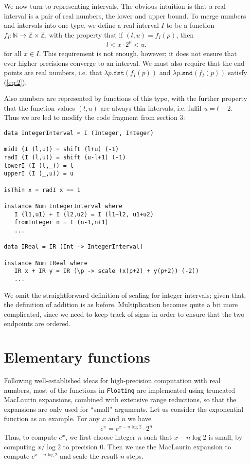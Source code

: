 \documentclass[9pt, a4, twocolumn]{article}
\begin{document}
We now turn to representing intervals. The obvious intuition is that a
real interval is a pair of real numbers, the lower and upper bound. 
To merge numbers and intervals into one type, we define a real interval $I$ to be a function 
$f_I : \mathbb{N} \rightarrow \mathbb{Z} \times \mathbb{Z}$, with the
property that if $(l,u) = f_I(p)$, then 
\begin{align*}
l < x \cdot 2^p < u.  
\end{align*}
for all $x \in I$. This requirement is not enough, however; it does
not ensure that ever higher precisions converge to an interval. We must
also require that the end points are real numbers, i.e. that
$\lambda p.\texttt{fst}(f_I(p))$ and $\lambda p.\texttt{snd}(f_I(p))$ 
satisfy (\ref{eq:2}).

Also numbers are represented by functions of this type, with the
further property that the function values $(l,u)$ are always thin
intervals, i.e. fulfil $u=l+2$. Thus we are led to modify the code
fragment from section 3:
\begin{verbatim}
data IntegerInterval = I (Integer, Integer) 

midI (I (l,u)) = shift (l+u) (-1)
radI (I (l,u)) = shift (u-l+1) (-1)
lowerI (I (l,_)) = l
upperI (I (_,u)) = u

isThin x = radI x == 1

instance Num IntegerInterval where
   I (l1,u1) + I (l2,u2) = I (l1+l2, u1+u2)
   fromInteger n = I (n-1,n+1)
   ...

data IReal = IR (Int -> IntegerInterval) 

instance Num IReal where
   IR x + IR y = IR (\p -> scale (x(p+2) + y(p+2)) (-2))  
   ...
\end{verbatim}
We omit the straightforward definition of scaling for integer
intervals; given that, the definition of addition is as before. 
Multiplication becomes quite a bit more complicated, since we need to keep
track of signs in order to ensure that the two endpoints are ordered.

\section{Elementary functions}

Following well-established ideas for high-precision computation with
real numbers, most of the functions in
\texttt{Floating} are implemented using truncated MacLaurin expansions,
combined with extensive range reductions, so that the expansions are
only used for ``small''  arguments. Let us consider the exponential
function as an example. For any $x$ and $n$ we have
\begin{align*}
  e^x = e^{x - n \log 2} \cdot 2^n
\end{align*}
Thus, to compute $e^x$, we first choose integer $n$ such that $x - n \log 2$ is
small, by computing $x/\log 2$ to precision 0. Then we
use the MacLaurin expansion to compute $e^{x - n \log 2}$ and scale
the result $n$ steps.
\end{document}
